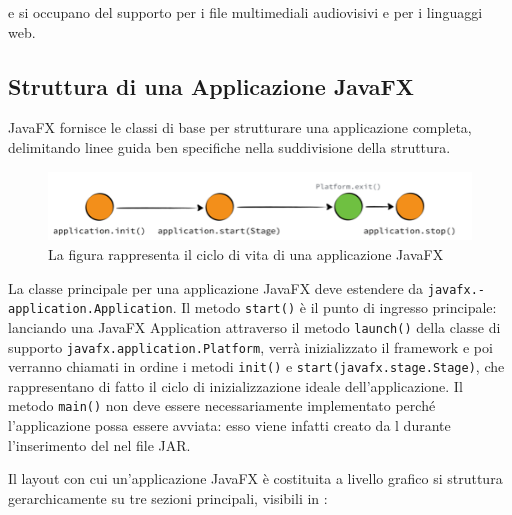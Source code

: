              e  si occupano del supporto per i file multimediali audiovisivi e per i linguaggi web.

        \subsection{Struttura di una Applicazione JavaFX}\label{sub:jfxStruttura}

            JavaFX fornisce le classi di base per strutturare una applicazione completa, delimitando linee guida ben specifiche nella suddivisione della struttura.

            \begin{figure}[htbp]
                \centering
                \includegraphics[scale=1]{img/jfxLifecycle}
                \caption{La figura rappresenta il ciclo di vita di una applicazione JavaFX}
                \label{fig:jfxLife}
            \end{figure}

            La classe principale per una applicazione JavaFX deve estendere da \texttt{javafx\dothyp application\dothyp Application}. Il metodo \texttt{start()} è il punto di ingresso principale: lanciando una JavaFX Application attraverso il metodo \texttt{launch()} della classe di supporto \texttt{javafx\dothyp application\dothyp Platform}, verrà inizializzato il framework e poi verranno chiamati in ordine i metodi \texttt{init()} e \texttt{start(javafx\dothyp stage\dothyp Stage)}, che rappresentano di fatto il ciclo di inizializzazione ideale dell'applicazione.
            Il metodo \texttt{main()} non deve essere necessariamente implementato perché l'applicazione possa essere avviata: esso viene infatti creato da l durante l'inserimento del  nel file JAR.

            Il layout con cui un'applicazione JavaFX è costituita a livello grafico si struttura gerarchicamente su tre sezioni principali, visibili in :

